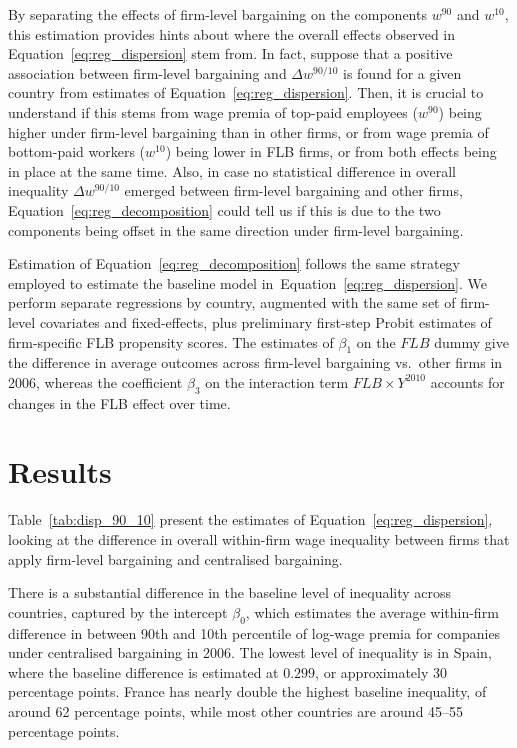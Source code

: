 \documentclass[12pt]{article}
\begin{document}
By separating the effects of firm-level bargaining on the components $w^{90}$ and $w^{10}$, this estimation provides hints about where the overall effects observed in Equation~\eqref{eq:reg_dispersion} stem from. In fact, suppose that a positive association between firm-level bargaining and $\Delta w^{90/10}$ is found for a given country from estimates of Equation~\eqref{eq:reg_dispersion}. Then, it is crucial to understand if this stems from wage premia of top-paid employees ($w^{90}$) being higher under firm-level bargaining than in other firms, or from wage premia of bottom-paid workers ($w^{10}$) being lower in FLB firms, or from both effects being in place at the same time. Also, in case no statistical difference in overall inequality $\Delta w^{90/10}$ emerged between firm-level bargaining and other firms, Equation~\eqref{eq:reg_decomposition} could tell us if this is due to the two components being offset in the same direction under firm-level bargaining. 

Estimation of Equation~\eqref{eq:reg_decomposition} follows the same strategy employed to estimate the baseline model in~Equation~\eqref{eq:reg_dispersion}. We perform separate regressions by country, augmented with the same set of firm-level covariates and fixed-effects, plus preliminary first-step Probit estimates of firm-specific FLB propensity scores. The estimates of $\beta_1$ on the $\mathit{FLB}$ dummy give the difference in average outcomes across firm-level bargaining vs.~other firms in 2006, whereas the coefficient $\beta_3$ on the interaction term $\mathit{FLB} \times Y^{2010}$ accounts for changes in the FLB effect over time.

\section{Results}
\label{sec:results}

Table~\ref{tab:disp_90_10} present the estimates of Equation~\eqref{eq:reg_dispersion}, looking at the difference in overall within-firm wage inequality between firms that apply firm-level bargaining and centralised bargaining.

There is a substantial difference in the baseline level of inequality across countries, captured by the intercept $\beta_0$, which estimates the average within-firm difference in between 90th and 10th percentile of log-wage premia for companies under centralised bargaining in 2006. The lowest level of inequality is in Spain, where the baseline difference is estimated at $0.299$, or approximately 30 percentage points. France has nearly double the highest baseline inequality, of around 62 percentage points, while most other countries are around 45--55 percentage points.
\end{document}
